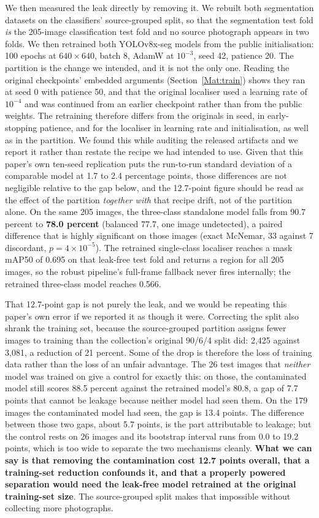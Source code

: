\documentclass{melba}
\begin{document}
We then measured the leak directly by removing it. We rebuilt both segmentation datasets on the classifiers' source-grouped split, so that the segmentation test fold \emph{is} the 205-image classification test fold and no source photograph appears in two folds. We then retrained both YOLOv8x-seg models from the public initialisation: 100 epochs at $640\times640$, batch 8, AdamW at $10^{-3}$, seed 42, patience 20. The partition is the change we intended, and it is not the only one. Reading the original checkpoints' embedded arguments (Section~\ref{Mat:train}) shows they ran at seed 0 with patience 50, and that the original localiser used a learning rate of $10^{-4}$ and was continued from an earlier checkpoint rather than from the public weights. The retraining therefore differs from the originals in seed, in early-stopping patience, and for the localiser in learning rate and initialisation, as well as in the partition. We found this while auditing the released artifacts and we report it rather than restate the recipe we had intended to use. Given that this paper's own ten-seed replication puts the run-to-run standard deviation of a comparable model at 1.7 to 2.4 percentage points, those differences are not negligible relative to the gap below, and the 12.7-point figure should be read as the effect of the partition \emph{together with} that recipe drift, not of the partition alone. On the same 205 images, the three-class standalone model falls from 90.7 percent to \textbf{78.0 percent} (balanced 77.7, one image undetected), a paired difference that is highly significant on those images (exact McNemar, 33 against 7 discordant, $p=4\times10^{-5}$). The retrained single-class localiser reaches a mask mAP50 of 0.695 on that leak-free test fold and returns a region for all 205 images, so the robust pipeline's full-frame fallback never fires internally; the retrained three-class model reaches 0.566.

That 12.7-point gap is not purely the leak, and we would be repeating this paper's own error if we reported it as though it were. Correcting the split also shrank the training set, because the source-grouped partition assigns fewer images to training than the collection's original 90/6/4 split did: 2{,}425 against 3{,}081, a reduction of 21 percent. Some of the drop is therefore the loss of training data rather than the loss of an unfair advantage. The 26 test images that \emph{neither} model was trained on give a control for exactly this: on those, the contaminated model still scores 88.5 percent against the retrained model's 80.8, a gap of 7.7 points that cannot be leakage because neither model had seen them. On the 179 images the contaminated model had seen, the gap is 13.4 points. The difference between those two gaps, about 5.7 points, is the part attributable to leakage; but the control rests on 26 images and its bootstrap interval runs from 0.0 to 19.2 points, which is too wide to separate the two mechanisms cleanly. \textbf{What we can say is that removing the contamination cost 12.7 points overall, that a training-set reduction confounds it, and that a properly powered separation would need the leak-free model retrained at the original training-set size}. The source-grouped split makes that impossible without collecting more photographs.
\end{document}
